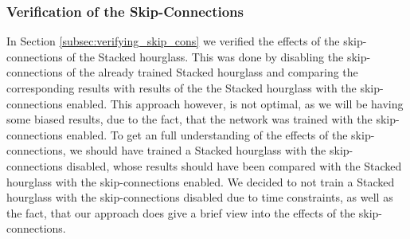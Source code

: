 \documentclass[./main.tex]{subfiles}
\begin{document}
\subsubsection{Verification of the Skip-Connections}
In Section \ref{subsec:verifying_skip_cons} we verified the effects of the skip-connections of the Stacked hourglass. This was done by disabling the skip-connections of the already trained Stacked hourglass and comparing the corresponding results with results of the the Stacked hourglass with the skip-connections enabled. This approach however, is not optimal, as we will be having some biased results, due to the fact, that the network was trained with the skip-connections enabled. To get an full understanding of the effects of the skip-connections, we should have trained a Stacked hourglass with the skip-connections disabled, whose results should have been compared with the Stacked hourglass with the skip-connections enabled. We decided to not train a Stacked hourglass with the skip-connections disabled due to time constraints, as well as the fact, that our approach does give a brief view into the effects of the skip-connections.
\end{document}
